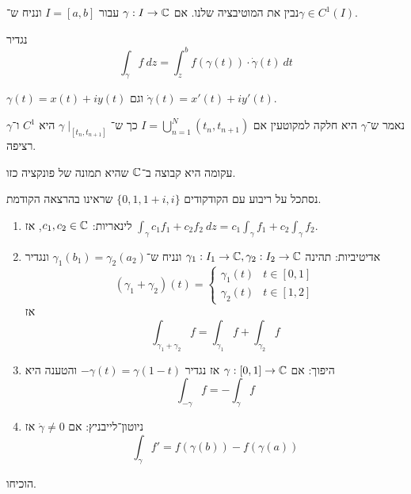 נבין את המוטיבציה שלנו. אם $\gamma : I \to \mathbb{C}$ עבור $I = [a, b]$ ונניח ש־$\gamma \in C^1(I)$.
\begin{definition}
	נגדיר
	\[
		\int_\gamma f\ dz = \int_z^b f(\gamma(t)) \cdot \dot{\gamma}(t)\ dt
	\]
\end{definition}
\begin{remark}
	$\gamma(t) = x(t) + i y(t)$ וגם $\dot{\gamma}(t) = x'(t) + i y'(t)$.
\end{remark}
\begin{definition}
	נאמר ש־$\gamma$ היא חלקה למקוטעין אם $I = \bigcup_{n = 1}^N (t_n, t_{n + 1})$ כך ש־$\gamma \mid_{[t_n, t_{n + 1}]}$ היא $C^1$ ו־$\gamma$ רציפה.
\end{definition}
\begin{definition}[עקומה]
	עקומה היא קבוצה ב־$\mathbb{C}$ שהיא תמונה של פונקציה כזו.
\end{definition}
\begin{example}
	נסתכל על ריבוע עם הקודקודים $\{0, 1, 1 + i, i\}$ שראינו בהרצאה הקודמת.
\end{example}
\begin{proposition}[תכונות]
	\begin{enumerate}
		\item לינאריות: $c_1, c_2 \in \mathbb{C}$, אז $\int_\gamma c_1 f_1 + c_2 f_2\ dz = c_1 \int_\gamma f_1 + c_2 \int_\gamma f_2$.
		\item אדיטיביות: תהינה $\gamma_1 : I_1 \to \mathbb{C}, \gamma_2 : I_2 \to \mathbb{C}$ ונניח ש־$\gamma_1(b_1) = \gamma_2(a_2)$ ונגדיר
			\[
				(\gamma_1 + \gamma_2)(t) = \begin{cases}
					\gamma_1(t) & t \in [0, 1] \\
					\gamma_2(t) & t \in [1, 2]
				\end{cases}
			\]
			אז
			\[
				\int_{\gamma_1 + \gamma_2} f = \int_{\gamma_1} f + \int_{\gamma_2} f
			\]
		\item היפוך: אם $\gamma : [0, 1] \to \mathbb{C}$ אז נגדיר $-\gamma(t) = \gamma(1 - t)$ והטענה היא
			\[
				\int_{-\gamma} f = - \int_\gamma f
			\]
		\item ניוטון־לייבניץ: אם $\dot{\gamma} \ne 0$ אז
			\[
				\int_\gamma f' = f(\gamma(b)) - f(\gamma(a))
			\]
	\end{enumerate}
\end{proposition}
\begin{exercise}
	הוכיחו.
\end{exercise}
